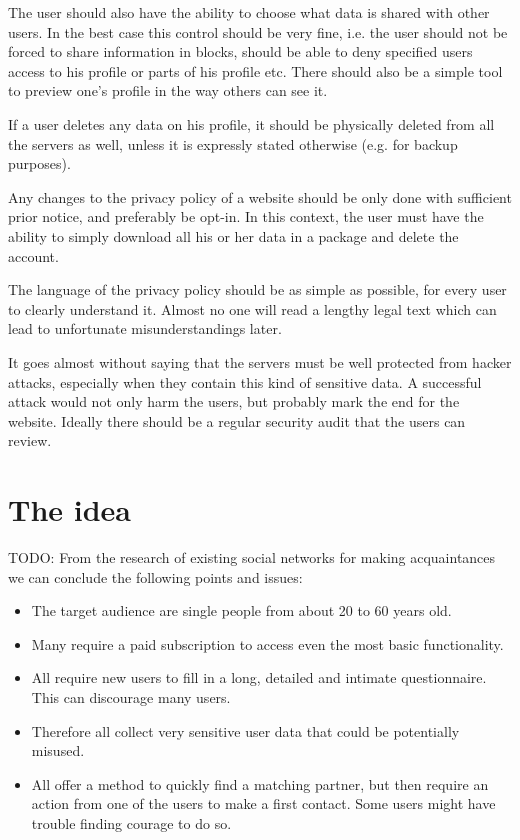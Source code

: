 \documentclass[12pt,oneside]{fithesis}
\begin{document}
	The user should also have the ability to choose what data is shared with other users. In the best case this control should be very fine, i.e. the user should not be forced to share information in blocks, should be able to deny specified users access to his profile or parts of his profile etc. There should also be a simple tool to preview one's profile in the way others can see it.
	
	If a user deletes any data on his profile, it should be physically deleted from all the servers as well, unless it is expressly stated otherwise (e.g. for backup purposes).
	
	Any changes to the privacy policy of a website should be only done with sufficient prior notice, and preferably be opt-in. In this context, the user must have the ability to simply download all his or her data in a package and delete the account.
	
	The language of the privacy policy should be as simple as possible, for every user to clearly understand it. Almost no one will read a lengthy legal text which can lead to unfortunate misunderstandings later.
	
	It goes almost without saying that the servers must be well protected from hacker attacks, especially when they contain this kind of sensitive data. A successful attack would not only harm the users, but probably mark the end for the website. Ideally there should be a regular security audit that the users can review.

\section{The idea}
	TODO:
	\cite{Finkel01012012}
	From the research of existing social networks for making acquaintances we can conclude the following points and issues:
	\begin{itemize}
		\item The target audience are single people from about 20 to 60 years old.
		\item Many require a paid subscription to access even the most basic functionality.
		\item All require new users to fill in a long, detailed and intimate questionnaire. This can discourage many users.
		\item Therefore all collect very sensitive user data that could be potentially misused.
		\item All offer a method to quickly find a matching partner, but then require an action from one of the users to make a first contact. Some users might have trouble finding courage to do so.
	\end{itemize}
\end{document}
